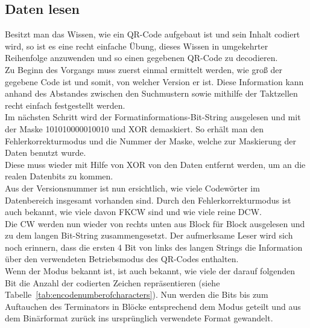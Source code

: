 \subsection{Daten lesen}
Besitzt man das Wissen, wie ein QR-Code aufgebaut ist und sein Inhalt codiert wird, so ist es eine recht einfache Übung, dieses Wissen in umgekehrter Reihenfolge anzuwenden und so einen gegebenen QR-Code zu decodieren.\\
Zu Beginn des Vorgangs muss zuerst einmal ermittelt werden, wie groß der gegebene Code ist und somit, von welcher Version er ist. Diese Information kann anhand des Abstandes zwischen den Suchmustern sowie mithilfe der Taktzellen recht einfach festgestellt werden.\\
Im nächsten Schritt wird der Formatinformations-Bit-String ausgelesen und mit der Maske 101010000010010 und XOR demaskiert. So erhält man den Fehlerkorrekturmodus und die Nummer der Maske, welche zur Maskierung der Daten benutzt wurde.\\
Diese muss wieder mit Hilfe von XOR von den Daten entfernt werden, um an die realen Datenbits zu kommen.\\
Aus der Versionsnummer ist nun ersichtlich, wie viele Codewörter im Datenbereich insgesamt vorhanden sind. Durch den Fehlerkorrekturmodus ist auch bekannt, wie viele davon FKCW sind und wie viele reine DCW.\\
Die CW werden nun wieder von rechts unten aus Block für Block ausgelesen und zu dem langen Bit-String zusammengesetzt. Der aufmerksame Leser wird sich noch erinnern, dass die ersten 4 Bit von links des langen Strings die Information über den verwendeten Betriebsmodus des QR-Codes enthalten.\\
Wenn der Modus bekannt ist, ist auch bekannt, wie viele der darauf folgenden Bit die Anzahl der codierten Zeichen repräsentieren (siehe Tabelle~\ref{tab:encodenumberofcharacters}). Nun werden die Bits bis zum Auftauchen des Terminators in Blöcke entsprechend dem Modus geteilt und aus dem Binärformat zurück ins ursprünglich verwendete Format gewandelt.
     
\pagebreak
